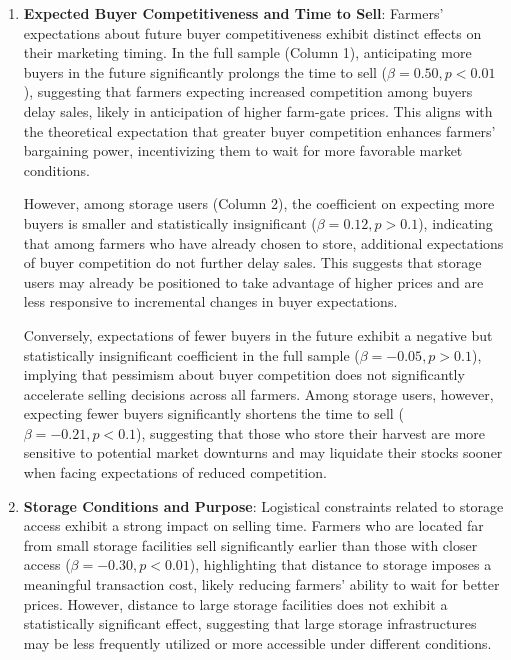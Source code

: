 \documentclass[12pt]{article}
\begin{document}
\begin{enumerate}
    \item \textbf{Expected Buyer Competitiveness and Time to Sell}: Farmers' expectations about future buyer competitiveness exhibit distinct effects on their marketing timing. In the full sample (Column 1), anticipating more buyers in the future significantly prolongs the time to sell (\(\beta = 0.50, p<0.01\)), suggesting that farmers expecting increased competition among buyers delay sales, likely in anticipation of higher farm-gate prices. This aligns with the theoretical expectation that greater buyer competition enhances farmers' bargaining power, incentivizing them to wait for more favorable market conditions.  
    
    However, among storage users (Column 2), the coefficient on expecting more buyers is smaller and statistically insignificant (\(\beta = 0.12, p>0.1\)), indicating that among farmers who have already chosen to store, additional expectations of buyer competition do not further delay sales. This suggests that storage users may already be positioned to take advantage of higher prices and are less responsive to incremental changes in buyer expectations.  
    
    Conversely, expectations of fewer buyers in the future exhibit a negative but statistically insignificant coefficient in the full sample (\(\beta = -0.05, p>0.1\)), implying that pessimism about buyer competition does not significantly accelerate selling decisions across all farmers. Among storage users, however, expecting fewer buyers significantly shortens the time to sell (\(\beta = -0.21, p<0.1\)), suggesting that those who store their harvest are more sensitive to potential market downturns and may liquidate their stocks sooner when facing expectations of reduced competition.

    \item \textbf{Storage Conditions and Purpose}: Logistical constraints related to storage access exhibit a strong impact on selling time. Farmers who are located far from small storage facilities sell significantly earlier than those with closer access (\(\beta = -0.30, p<0.01\)), highlighting that distance to storage imposes a meaningful transaction cost, likely reducing farmers' ability to wait for better prices. However, distance to large storage facilities does not exhibit a statistically significant effect, suggesting that large storage infrastructures may be less frequently utilized or more accessible under different conditions.  
    

\end{enumerate}
\end{document}
